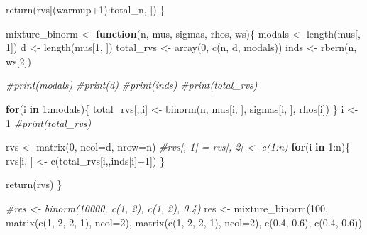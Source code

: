 \documentclass[
]{article}
\newenvironment{Shaded}{\begin{snugshade}}{\end{snugshade}}
\newcommand{\AttributeTok}[1]{\textcolor[rgb]{0.77,0.63,0.00}{#1}}
\newcommand{\CommentTok}[1]{\textcolor[rgb]{0.56,0.35,0.01}{\textit{#1}}}
\newcommand{\ControlFlowTok}[1]{\textcolor[rgb]{0.13,0.29,0.53}{\textbf{#1}}}
\newcommand{\DecValTok}[1]{\textcolor[rgb]{0.00,0.00,0.81}{#1}}
\newcommand{\FloatTok}[1]{\textcolor[rgb]{0.00,0.00,0.81}{#1}}
\newcommand{\FunctionTok}[1]{\textcolor[rgb]{0.00,0.00,0.00}{#1}}
\newcommand{\NormalTok}[1]{#1}
\newcommand{\OtherTok}[1]{\textcolor[rgb]{0.56,0.35,0.01}{#1}}
\newcommand{\SpecialCharTok}[1]{\textcolor[rgb]{0.00,0.00,0.00}{#1}}
\begin{document}
\begin{Shaded}
\begin{Highlighting}[]
  \FunctionTok{return}\NormalTok{(rvs[(warmup}\SpecialCharTok{+}\DecValTok{1}\NormalTok{)}\SpecialCharTok{:}\NormalTok{total\_n, ])}
\NormalTok{\}}

\NormalTok{mixture\_binorm }\OtherTok{\textless{}{-}} \ControlFlowTok{function}\NormalTok{(n, mus, sigmas, rhos, ws)\{}
\NormalTok{  modals }\OtherTok{\textless{}{-}} \FunctionTok{length}\NormalTok{(mus[, }\DecValTok{1}\NormalTok{])}
\NormalTok{  d }\OtherTok{\textless{}{-}} \FunctionTok{length}\NormalTok{(mus[}\DecValTok{1}\NormalTok{, ])}
\NormalTok{  total\_rvs }\OtherTok{\textless{}{-}} \FunctionTok{array}\NormalTok{(}\DecValTok{0}\NormalTok{, }\FunctionTok{c}\NormalTok{(n, d, modals))}
\NormalTok{  inds }\OtherTok{\textless{}{-}} \FunctionTok{rbern}\NormalTok{(n, ws[}\DecValTok{2}\NormalTok{])}
  
  \CommentTok{\#print(modals)}
  \CommentTok{\#print(d)}
  \CommentTok{\#print(inds)}
  \CommentTok{\#print(total\_rvs)}
  
  \ControlFlowTok{for}\NormalTok{(i }\ControlFlowTok{in} \DecValTok{1}\SpecialCharTok{:}\NormalTok{modals)\{}
\NormalTok{    total\_rvs[,,i] }\OtherTok{\textless{}{-}} \FunctionTok{binorm}\NormalTok{(n, mus[i, ], sigmas[i, ], rhos[i])}
\NormalTok{  \}}
\NormalTok{  i }\OtherTok{\textless{}{-}} \DecValTok{1}
  \CommentTok{\#print(total\_rvs)}
  
\NormalTok{  rvs }\OtherTok{\textless{}{-}} \FunctionTok{matrix}\NormalTok{(}\DecValTok{0}\NormalTok{, }\AttributeTok{ncol=}\NormalTok{d, }\AttributeTok{nrow=}\NormalTok{n)}
  \CommentTok{\#rvs[, 1] = rvs[, 2] \textless{}{-} c(1:n)}
  \ControlFlowTok{for}\NormalTok{(i }\ControlFlowTok{in} \DecValTok{1}\SpecialCharTok{:}\NormalTok{n)\{}
\NormalTok{    rvs[i, ] }\OtherTok{\textless{}{-}} \FunctionTok{c}\NormalTok{(total\_rvs[i,,inds[i]}\SpecialCharTok{+}\DecValTok{1}\NormalTok{])}
\NormalTok{  \}}
  
  \FunctionTok{return}\NormalTok{(rvs)}
\NormalTok{\}}

\CommentTok{\#res \textless{}{-} binorm(10000, c(1, 2), c(1, 2), 0.4)}
\NormalTok{res }\OtherTok{\textless{}{-}} \FunctionTok{mixture\_binorm}\NormalTok{(}\DecValTok{100}\NormalTok{, }\FunctionTok{matrix}\NormalTok{(}\FunctionTok{c}\NormalTok{(}\DecValTok{1}\NormalTok{, }\DecValTok{2}\NormalTok{, }\DecValTok{2}\NormalTok{, }\DecValTok{1}\NormalTok{), }\AttributeTok{ncol=}\DecValTok{2}\NormalTok{), }\FunctionTok{matrix}\NormalTok{(}\FunctionTok{c}\NormalTok{(}\DecValTok{1}\NormalTok{, }\DecValTok{2}\NormalTok{, }\DecValTok{2}\NormalTok{, }\DecValTok{1}\NormalTok{), }\AttributeTok{ncol=}\DecValTok{2}\NormalTok{), }\FunctionTok{c}\NormalTok{(}\FloatTok{0.4}\NormalTok{, }\FloatTok{0.6}\NormalTok{), }\FunctionTok{c}\NormalTok{(}\FloatTok{0.4}\NormalTok{, }\FloatTok{0.6}\NormalTok{))}


\end{Highlighting}
\end{Shaded}
\end{document}
